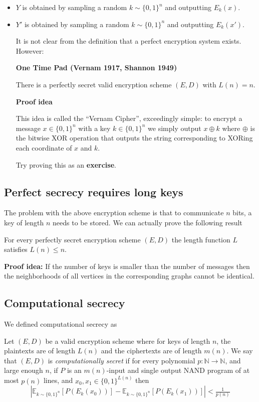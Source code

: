 \documentclass[10pt]{article}
\newcommand{\N}{\mathbb{N}}
\theoremstyle{definition}
\begin{document}
\begin{itemize}
\item 

$Y$ is obtained by sampling a random $k\sim \{0,1\}^n$ and
outputting $E_k(x)$.


\item 

$Y'$ is obtained by sampling a random $k\sim \{0,1\}^n$ and
outputting $E_k(x')$.

It is not clear from the definition that a perfect encryption system exists. However:

\textbf{One Time Pad (Vernam 1917, Shannon 1949)}

There is a perfectly secret valid encryption scheme $(E,D)$ with
$L(n)=n$.



\textbf{Proof idea}

This idea is called the
``Vernam Cipher'',
exceedingly simple: to encrypt a message $x\in \{0,1\}^n$ with a key
$k \in \{0,1\}^n$ we simply output $x \oplus k$ where $\oplus$ is the
bitwise XOR operation that outputs the string corresponding to XORing
each coordinate of $x$ and $k$.

Try proving this as an \textbf{exercise}.

\end{itemize}

\subsection{Perfect secrecy requires long keys}

The problem with the above encryption scheme is that to communicate $n$ bits, a key of length $n$ needs to be stored. We can actually prove the following result

For every perfectly secret encryption scheme $(E,D)$ the length function
$L$ satisfies $L(n) \leq n$.

\textbf{Proof idea:} If the number of keys is smaller than the number of messages then the
neighborhoods of all vertices in the corresponding graphs cannot be
identical.

\subsection{Computational secrecy}

We defined computational secrecy as

Let $(E,D)$ be a valid encryption scheme where for keys of length $n$,
the plaintexts are of length $L(n)$ and the ciphertexts are of length
$m(n)$. We say that $(E,D)$ is \emph{computationally secret} if for every
polynomial $p:\N \rightarrow \N$, and large enough $n$, if $P$ is an
$m(n)$-input and single output NAND program of at most $p(n)$ lines, and
$x_0,x_1 \in \{0,1\}^{L(n)}$ then \begin{equation}\left| \mathbb E_{k \sim \{0,1\}^n} [P(E_k(x_0))] -   \mathbb E_{k \sim \{0,1\}^n} [P(E_k(x_1))] \right| < \tfrac{1}{p(n)} \label{eqindist}\end{equation}
\end{document}
